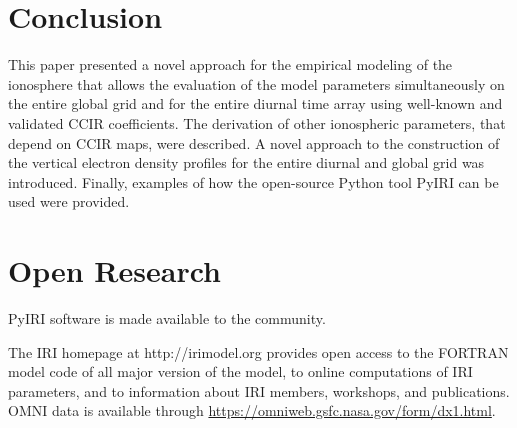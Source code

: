 \documentclass[draft]{agujournal2019}
\begin{document}
\section{Conclusion}
This paper presented a novel approach for the empirical modeling of the ionosphere that allows the evaluation of the model parameters simultaneously on the entire global grid and for the entire diurnal time array using well-known and validated CCIR coefficients. The derivation of other ionospheric parameters, that depend on CCIR maps, were described. A novel approach to the construction of the vertical electron density profiles for the entire diurnal and global grid was introduced. Finally, examples of how the open-source Python tool PyIRI can be used were provided. 


\section{Open Research}
PyIRI software is made available to the community. 

\acknowledgments
The IRI homepage at http://irimodel.org provides
open access to the FORTRAN model
code of all major version of the model, to
online computations of IRI parameters,
and to information about IRI members,
workshops, and publications. OMNI data is available through 
\url{https://omniweb.gsfc.nasa.gov/form/dx1.html}.




\end{document}
